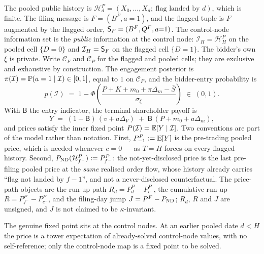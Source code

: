 \begin{definition}
\label{def:prices}
The pooled public history is $\mathcal H_d^P = (X_0,\dots,X_d;\ \text{flag landed by } d)$, which is
finite. The filing message is $F = (B^F, a{=}1)$, and the flagged tuple is $F$ augmented by the
flagged order, $\mathsf{S}_F = (B^F,Q^F,a{=}1)$. The control-node information set is the \emph{public}
information at the control node: $\mathcal I_H = \mathcal H_H^P$ on the pooled cell $\{D=0\}$ and
$\mathcal I_H = \mathsf{S}_F$ on the flagged cell $\{D=1\}$. The bidder's own $\xi$ is private. Write
$\mathcal C_F$ and $\mathcal C_P$ for the flagged and pooled cells; they are exclusive and
exhaustive by construction. The engagement posterior is $\pi(\mathcal I) = \mathbb{P}(a=1\mid\mathcal I)
\in [0,1]$, equal to $1$ on $\mathcal C_F$, and the bidder-entry probability is
\begin{equation}
\label{eq:entry}
p(\mathcal I) \;=\; 1 - \Phi\!\left(\frac{P + K + m_0 + \pi\Delta_m - \bar S}{\sigma_\xi}\right)
\;\in\;(0,1).
\end{equation}
With $\mathsf B$ the entry indicator, the terminal shareholder payoff is
\begin{equation}
\label{eq:Y}
Y \;=\; (1-\mathsf B)\,(v + a\Delta_V) \;+\; \mathsf B\,(P + m_0 + a\Delta_m),
\end{equation}
and prices satisfy the inner fixed point $P(\mathcal I) = \mathbb{E}[Y\mid\mathcal I]$. Two conventions are
part of the model rather than notation. First, $P_{-1}^P := \mathbb{E}[Y]$ is the pre-trading pooled
price, which is needed whenever $c = 0$ --- as $T = H$ forces on every flagged history. Second,
$P_{\mathrm{ND}}(\mathcal H_{f^-}^P) := P_{f^-}^P$: the not-yet-disclosed price is the last pre-filing pooled
price at the \emph{same} realised order flow, whose history already carries ``flag not landed by
$f-1$'', and not a never-disclosed counterfactual. The price-path objects are the run-up path
$R_d = P_d^P - P_{c^-}^P$, the cumulative run-up $R = P_{f^-}^P - P_{c^-}^P$, and the filing-day
jump $J = P^F - P_{\mathrm{ND}}$; $R_d$, $R$ and $J$ are unsigned, and $J$ is not claimed to be
$\kappa$-invariant.
\end{definition}

The genuine fixed point sits at the control nodes. At an earlier pooled date $d < H$ the price is a
tower expectation of already-solved control-node values, with no self-reference; only the
control-node map is a fixed point to be solved.

